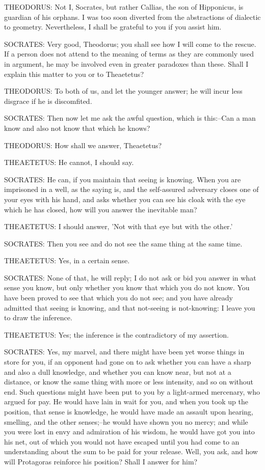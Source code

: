 THEODORUS: Not I, Socrates, but rather Callias, the son of Hipponicus,
is guardian of his orphans. I was too soon diverted from the
abstractions of dialectic to geometry. Nevertheless, I shall be grateful
to you if you assist him.

SOCRATES: Very good, Theodorus; you shall see how I will come to the
rescue. If a person does not attend to the meaning of terms as they are
commonly used in argument, he may be involved even in greater paradoxes
than these. Shall I explain this matter to you or to Theaetetus?

THEODORUS: To both of us, and let the younger answer; he will incur less
disgrace if he is discomfited.

SOCRATES: Then now let me ask the awful question, which is this:--Can a
man know and also not know that which he knows?

THEODORUS: How shall we answer, Theaetetus?

THEAETETUS: He cannot, I should say.

SOCRATES: He can, if you maintain that seeing is knowing. When you are
imprisoned in a well, as the saying is, and the self-assured adversary
closes one of your eyes with his hand, and asks whether you can see
his cloak with the eye which he has closed, how will you answer the
inevitable man?

THEAETETUS: I should answer, 'Not with that eye but with the other.'

SOCRATES: Then you see and do not see the same thing at the same time.

THEAETETUS: Yes, in a certain sense.

SOCRATES: None of that, he will reply; I do not ask or bid you answer
in what sense you know, but only whether you know that which you do not
know. You have been proved to see that which you do not see; and you
have already admitted that seeing is knowing, and that not-seeing is
not-knowing: I leave you to draw the inference.

THEAETETUS: Yes; the inference is the contradictory of my assertion.

SOCRATES: Yes, my marvel, and there might have been yet worse things in
store for you, if an opponent had gone on to ask whether you can have a
sharp and also a dull knowledge, and whether you can know near, but not
at a distance, or know the same thing with more or less intensity,
and so on without end. Such questions might have been put to you by a
light-armed mercenary, who argued for pay. He would have lain in wait
for you, and when you took up the position, that sense is knowledge,
he would have made an assault upon hearing, smelling, and the other
senses;--he would have shown you no mercy; and while you were lost in
envy and admiration of his wisdom, he would have got you into his
net, out of which you would not have escaped until you had come to an
understanding about the sum to be paid for your release. Well, you ask,
and how will Protagoras reinforce his position? Shall I answer for him?

